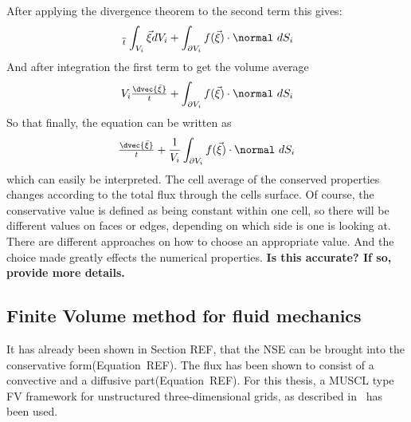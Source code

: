 \documentclass[../main.tex]{subfiles}
\begin{document}
After applying the divergence theorem to the second term this gives:
\begin{align}
\tfrac{~}{t}\int_{V_i} \vec{\xi} dV_i + \int_{\partial V_i} f(\vec{\xi})\cdot\normal~dS_i
\end{align}
And after integration the first term to get the volume average
\begin{align}
V_i \tfrac{\dvec{\bar{\xi}}}{t} + \int_{\partial V_i} f(\vec{\xi})\cdot\normal~dS_i
\end{align}
So that finally, the equation can be written as
\begin{align}
\tfrac{\dvec{\bar{\xi}}}{t} + \frac{1}{V_i} \int_{\partial V_i} f(\vec{\xi})\cdot\normal~dS_i
\end{align}
which can easily be interpreted. The cell average of the conserved properties changes according to the total flux through the cells surface.
Of course, the conservative value is defined as being constant within one cell, so there will be different values on faces or edges, depending on which side is one is looking at. There are different approaches on how to choose an appropriate value. And the choice made greatly effects the numerical properties. \textbf{Is this accurate? If so, provide more details.}

\subsection{Finite Volume method for fluid mechanics}\label{sec:fv_fluid_mechanics}
It has already been shown in Section REF, that the \ac{NSE} can be brought into the conservative form(Equation~REF). The flux has been shown to consist of a convective and a diffusive part(Equation~REF).
For this thesis, a \ac{MUSCL} type \ac{FV} framework for unstructured three-dimensional grids, as described in~\cite{Main2014} has been used.
\end{document}
